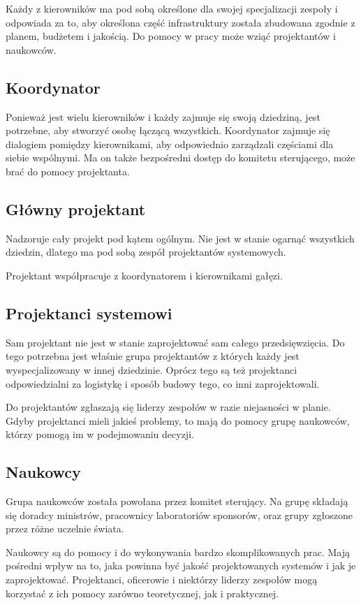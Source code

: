 Każdy z kierowników ma pod sobą określone dla swojej specjalizacji zespoły i odpowiada za to, aby określona część infrastruktury została zbudowana zgodnie z planem, budżetem i jakością.
Do pomocy w pracy może wziąć projektantów i naukowców.

\subsection{Koordynator}
Ponieważ jest wielu kierowników i każdy zajmuje się swoją dziedziną, jest potrzebne, aby stworzyć osobę łączącą wszystkich.
Koordynator zajmuje się dialogiem pomiędzy kierownikami, aby odpowiednio zarządzali częściami dla siebie wspólnymi.
Ma on także bezpośredni dostęp do komitetu sterującego, może brać do pomocy projektanta.

\subsection{Główny projektant}
Nadzoruje cały projekt pod kątem ogólnym. 
Nie jest w stanie ogarnąć wszystkich dziedzin, dlatego ma pod sobą zespół projektantów systemowych.

Projektant współpracuje z koordynatorem i kierownikami gałęzi.

\subsection{Projektanci systemowi}
Sam projektant nie jest w stanie zaprojektować sam całego przedsięwzięcia.
Do tego potrzebna jest właśnie grupa projektantów z których każdy jest wyspecjalizowany w innej dziedzinie.
Oprócz tego są też projektanci odpowiedzialni za logistykę i sposób budowy tego, co inni zaprojektowali.

Do projektantów zgłaszają się liderzy zespołów w razie niejasności w planie.
Gdyby projektanci mieli jakieś problemy, to mają do pomocy grupę naukowców, którzy pomogą im w podejmowaniu decyzji.

\subsection{Naukowcy}
Grupa naukowców została powołana przez komitet sterujący.
Na grupę składają się doradcy ministrów, pracownicy laboratoriów sponsorów, oraz grupy zgłoszone przez różne uczelnie świata.

Naukowcy są do pomocy i do wykonywania bardzo skomplikowanych prac. 
Mają pośredni wpływ na to, jaka powinna być jakość projektowanych systemów i jak je zaprojektować.
Projektanci, oficerowie i niektórzy liderzy zespołów mogą korzystać z ich pomocy zarówno teoretycznej, jak i praktycznej.

